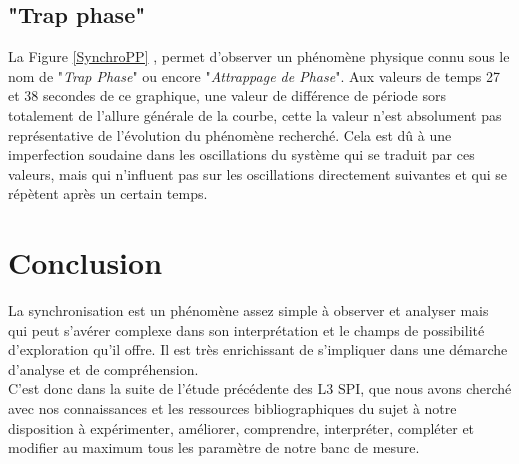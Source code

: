 \documentclass[a4paper,11pt]{report}
\begin{document}
\section{"Trap phase"}
La Figure \ref{SynchroPP} , permet d'observer un phénomène physique connu sous le nom de "{\it Trap Phase}" ou encore "{\it Attrappage de Phase}". Aux valeurs de temps 27 et 38 secondes de ce graphique, une valeur de différence de période sors totalement de l'allure générale de la courbe, cette la valeur n'est absolument pas représentative de l'évolution du phénomène recherché. Cela est dû à une imperfection soudaine dans les oscillations du système qui se traduit par ces valeurs, mais qui n'influent pas sur les oscillations directement suivantes et qui se répètent après un certain temps.
\newpage
\null
\thispagestyle{empty}

\chapter*{Conclusion}
La synchronisation est un phénomène assez simple à observer et analyser mais qui peut s'avérer complexe dans son interprétation et le champs de possibilité d'exploration qu'il offre. Il est très enrichissant de s'impliquer dans une démarche d'analyse et de compréhension.\\

C'est donc dans la suite de l'étude précédente des L3 SPI, que nous avons cherché avec nos connaissances et les ressources bibliographiques du sujet à notre disposition à expérimenter, améliorer, comprendre, interpréter, compléter et modifier au maximum tous les paramètre de notre banc de mesure.\\
\end{document}

